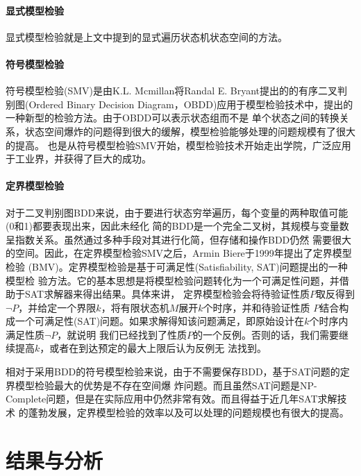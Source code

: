 \paragraph{显式模型检验}
显式模型检验就是上文中提到的显式遍历状态机状态空间的方法。

\paragraph{符号模型检验}
符号模型检验(SMV)是由K.L. Mcmillan将Randal E. Bryant提出的的有序二叉判别图(Ordered Binary
Decision Diagram，OBDD)应用于模型检验技术中，提出的一种新型的检验方法。由于OBDD可以表示状态组而不是
单个状态之间的转换关系，状态空间爆炸的问题得到很大的缓解，模型检验能够处理的问题规模有了很大的提高。
也是从符号模型检验SMV开始，模型检验技术开始走出学院，广泛应用于工业界，并获得了巨大的成功。

\paragraph{定界模型检验}
对于二叉判别图BDD来说，由于要进行状态穷举遍历，每个变量的两种取值可能(0和1)都要表现出来，因此未经化
简的BDD是一个完全二叉树，其规模与变量数呈指数关系。虽然通过多种手段对其进行化简，但存储和操作BDD仍然
需要很大的空间。因此，在定界模型检验SMV之后，Armin Biere于1999年提出了定界模型检验
(BMV)\cite{Biere03boundedmodel}。定界模型检验是基于可满足性(Satisfiability, SAT)问题提出的一种模型检
验方法。它的基本思想是将模型检验问题转化为一个可满足性问题，并借助于SAT求解器来得出结果。具体来讲，
定界模型检验会将待验证性质$P$取反得到$\neg P$，并给定一个界限$k$，将有限状态机$M$展开$k$个时序，并和待验证性质
$P$结合构成一个可满足性(SAT)问题。如果求解得知该问题满足，即原始设计在$k$个时序内满足性质$\neg P$，就说明
我们已经找到了性质$P$的一个反例。否则的话，我们需要继续提高$k$，或者在到达预定的最大上限后认为反例无
法找到。

相对于采用BDD的符号模型检验来说，由于不需要保存BDD，基于SAT问题的定界模型检验最大的优势是不存在空间爆
炸问题。而且虽然SAT问题是NP-Complete问题，但是在实际应用中仍然非常有效。而且得益于近几年SAT求解技术
的蓬勃发展，定界模型检验的效率以及可以处理的问题规模也有很大的提高。

\section{结果与分析}
\label{sec:hierarchy-results}


